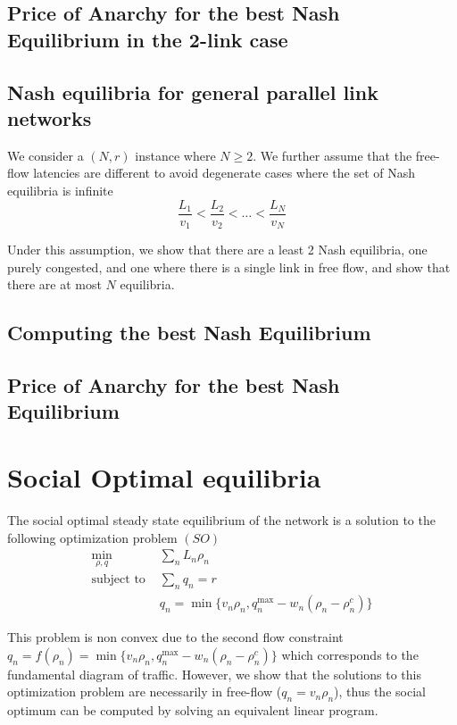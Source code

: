 \subsection{Price of Anarchy for the best Nash Equilibrium in the 2-link case}


\subsection{Nash equilibria for general parallel link networks}
We consider a $(N, r)$ instance where $N \geq 2$. We further assume that the free-flow latencies are different to avoid degenerate cases where the set of Nash equilibria is infinite
\[
\frac{L_1}{v_1} < \frac{L_2}{v_2} < \dots < \frac{L_N}{v_N}
\]

Under this assumption, we show that there are a least 2 Nash equilibria, one purely congested, and one where there is a single link in free flow, and show that there are at most $N$ equilibria.



\subsection{Computing the best Nash Equilibrium}


\subsection{Price of Anarchy for the best Nash Equilibrium}




\section{Social Optimal equilibria}
The social optimal steady state equilibrium of the network is a solution to the following optimization problem $(SO)$
\begin{align*}
\min_{\rho, q}  &\sum_n L_n \rho_n\\
\text{subject to }
& \sum_n q_n = r\\
& q_n = \min \{ v_n \rho_n, q_n^{\max} - w_n(\rho_n - \rho_n^c)\}
\end{align*}

This problem is non convex due to the second flow constraint $q_n = f(\rho_n) = \min \{ v_n \rho_n, q_n^{\max} - w_n(\rho_n - \rho_n^c)\}$
which corresponds to the fundamental diagram of traffic. However, we show that the solutions to this optimization problem are necessarily in free-flow ($q_n = v_n \rho_n$), thus the social optimum can be computed by solving an equivalent linear program.


